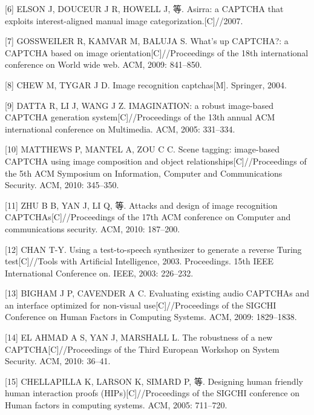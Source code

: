 \documentclass[bachelor,zhspacing]{cqu}  %
\begin{document}
\hypertarget{ref-elson2007asirra}{}
{[}6{]} ELSON J, DOUCEUR J R, HOWELL J, 等. Asirra: a CAPTCHA that
exploits interest-aligned manual image categorization.{[}C{]}//2007.

\hypertarget{ref-gossweiler2009s}{}
{[}7{]} GOSSWEILER R, KAMVAR M, BALUJA S. What's up CAPTCHA?: a CAPTCHA
based on image orientation{[}C{]}//Proceedings of the 18th international
conference on World wide web. ACM, 2009: 841--850.

\hypertarget{ref-chew2004image}{}
{[}8{]} CHEW M, TYGAR J D. Image recognition captchas{[}M{]}. Springer,
2004.

\hypertarget{ref-datta2005imagination}{}
{[}9{]} DATTA R, LI J, WANG J Z. IMAGINATION: a robust image-based
CAPTCHA generation system{[}C{]}//Proceedings of the 13th annual ACM
international conference on Multimedia. ACM, 2005: 331--334.

\hypertarget{ref-matthews2010scene}{}
{[}10{]} MATTHEWS P, MANTEL A, ZOU C C. Scene tagging: image-based
CAPTCHA using image composition and object
relationships{[}C{]}//Proceedings of the 5th ACM Symposium on
Information, Computer and Communications Security. ACM, 2010: 345--350.

\hypertarget{ref-zhu2010attacks}{}
{[}11{]} ZHU B B, YAN J, LI Q, 等. Attacks and design of image
recognition CAPTCHAs{[}C{]}//Proceedings of the 17th ACM conference on
Computer and communications security. ACM, 2010: 187--200.

\hypertarget{ref-chan2003using}{}
{[}12{]} CHAN T-Y. Using a test-to-speech synthesizer to generate a
reverse Turing test{[}C{]}//Tools with Artificial Intelligence, 2003.
Proceedings. 15th IEEE International Conference on. IEEE, 2003:
226--232.

\hypertarget{ref-bigham2009evaluating}{}
{[}13{]} BIGHAM J P, CAVENDER A C. Evaluating existing audio CAPTCHAs
and an interface optimized for non-visual use{[}C{]}//Proceedings of the
SIGCHI Conference on Human Factors in Computing Systems. ACM, 2009:
1829--1838.

\hypertarget{ref-el2010robustness}{}
{[}14{]} EL AHMAD A S, YAN J, MARSHALL L. The robustness of a new
CAPTCHA{[}C{]}//Proceedings of the Third European Workshop on System
Security. ACM, 2010: 36--41.

\hypertarget{ref-chellapilla2005designing}{}
{[}15{]} CHELLAPILLA K, LARSON K, SIMARD P, 等. Designing human friendly
human interaction proofs (HIPs){[}C{]}//Proceedings of the SIGCHI
conference on Human factors in computing systems. ACM, 2005: 711--720.
\end{document}
